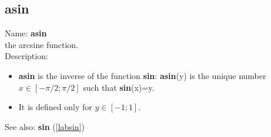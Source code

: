 \subsection{asin}
\label{labasin}
\noindent Name: \textbf{asin}\\
the arcsine function.\\

\noindent Description: \begin{itemize}

\item \textbf{asin} is the inverse of the function \textbf{sin}: \textbf{asin}(y) is the unique number 
   $x \in [-\pi/2; \pi/2]$ such that \textbf{sin}(x)=y.

\item It is defined only for $y \in [-1;1]$.
\end{itemize}
See also: \textbf{sin} (\ref{labsin})
